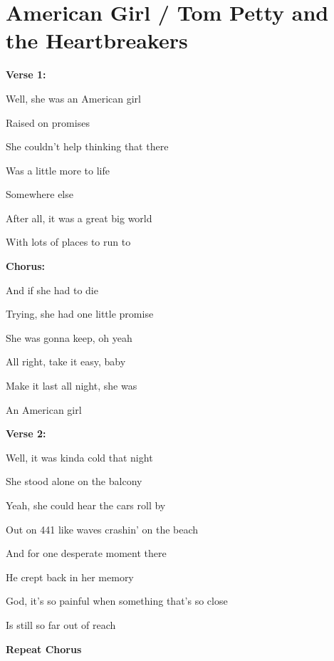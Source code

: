 \section{American Girl / Tom Petty and the Heartbreakers}\label{sec:americangirl}
\Cmajor
\Dmajor
\Fmajor
\Eminor

\textbf{Verse 1:}

Well, she was an American girl

Raised on promises

She couldn't help thinking that there

Was a little more to life

Somewhere else

After all, it was a great big world

With lots of places to run to

\textbf{Chorus:}

And if she had to die

Trying, she had one little promise

She was gonna keep, oh yeah

All right, take it easy, baby

Make it last all night, she was

An American girl

\textbf{Verse 2:}

Well, it was kinda cold that night

She stood alone on the balcony

Yeah, she could hear the cars roll by

Out on 441 like waves crashin' on the beach

And for one desperate moment there

He crept back in her memory

God, it's so painful when something that's so close

Is still so far out of reach

\textbf{Repeat Chorus}

